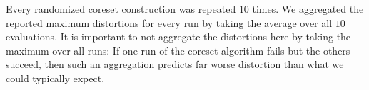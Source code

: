 Every randomized coreset construction was repeated $10$ times. We aggregated the reported maximum distortions for every run by taking the average over all $10$ evaluations. 
It is important to not aggregate the distortions here by taking the maximum over all runs: If one run of the coreset algorithm fails but the others succeed, then such an aggregation predicts far worse distortion than what we could typically expect.




